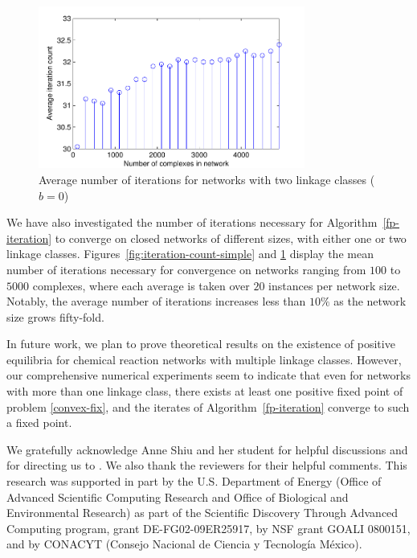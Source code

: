 \documentclass[smallextended]{svjour3}       %
\newcommand*{\0}{\mathbf{0}}
\newcommand*{\1}{\mathbf{1}}
\begin{document}
\begin{figure}%
   \centering
   \includegraphics[width=0.78\textwidth]{MultipleNetAvgIterationsVsNetSize} 
   \caption{Average number of iterations for networks with two linkage
            classes ($b=0$)}
   \label{fig:iteration-count-multiple} 
\end{figure}


We have also investigated the number of iterations necessary for
Algorithm~\ref{fp-iteration} to converge on closed networks of different
sizes, with either one or two linkage classes.
Figures~\ref{fig:iteration-count-simple} and
\ref{fig:iteration-count-multiple} display the mean number of
iterations necessary for convergence on networks ranging from $100$ to
$5000$ complexes, where each average is taken over $20$ instances per
network size. Notably, the average number of iterations increases less
than $10\%$ as the network size grows fifty-fold.

In future work, we plan to prove theoretical results on the existence of
positive equilibria for chemical reaction networks with multiple
linkage classes.  However, our comprehensive numerical experiments
seem to indicate that even for networks with more than one linkage
class, there exists at least one positive fixed point of problem
\eqref{convex-fix}, and the iterates of Algorithm~\ref{fp-iteration} converge
to such a fixed point.


\enlargethispage{3\baselineskip}

\begin{acknowledgements}
We gratefully acknowledge Anne Shiu and her student for helpful
discussions and for directing us to \cite{Deng}. 
We also thank the reviewers for their helpful comments.
This research was supported in part by the U.S. Department of Energy (Office
of Advanced Scientific Computing Research and Office of Biological
and Environmental Research) as part of the Scientific Discovery
Through Advanced Computing program, grant DE-FG02-09ER25917,
by NSF grant GOALI 0800151, and by CONACYT (Consejo Nacional de Ciencia
y Tecnolog\'ia M\'exico).
\end{acknowledgements}

\frenchspacing
 
{}
\end{document}
